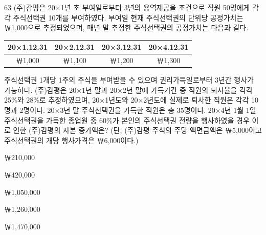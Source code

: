 \begin{question}{63}
(주)감평은 20×1년 초 부여일로부터 3년의 용역제공을 조건으로 직원 50명에게 각각 주식선택권 10개를 부여하였다. 부여일 현재 주식선택권의 단위당 공정가치는 ￦1,000으로 추정되었으며, 매년 말 추정한 주식선택권의 공정가치는 다음과 같다.
\par{\small\centering\begin{tabular}{|c|c|c|c|}\hline
20×1.12.31 & 20×2.12.31 & 20×3.12.31 & 20×4.12.31 \\ \hline
￦1,000 & ￦1,100 & ￦1,200 & ￦1,300 \\ \hline
\end{tabular}\par}
주식선택권 1개당 1주의 주식을 부여받을 수 있으며 권리가득일로부터 3년간 행사가 가능하다. (주)감평은 20×1년 말과 20×2년 말에 가득기간 중 직원의 퇴사율을 각각 25\%와 28\%로 추정하였으며, 20×1년도와 20×2년도에 실제로 퇴사한 직원은 각각 10명과 2명이다. 20×3년 말 주식선택권을 가득한 직원은 총 35명이다. 20×4년 1월 1일 주식선택권을 가득한 종업원 중 60\%가 본인의 주식선택권 전량을 행사하였을 경우 이로 인한 (주)감평의 자본 증가액은? (단, (주)감평 주식의 주당 액면금액은 ￦5,000이고 주식선택권의 개당 행사가격은 ￦6,000이다.)
\begin{choices}
  \item ￦210,000
  \item ￦420,000
  \item ￦1,050,000
  \item ￦1,260,000
  \item ￦1,470,000
\end{choices}
\end{question}
